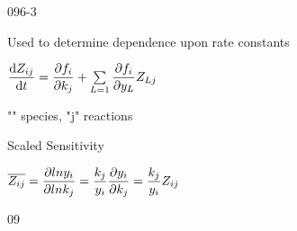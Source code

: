 \begin{mitframe}{096-3}
 \begin{listone}
	\item Used to determine dependence upon rate constants
    \item $\dfrac{\mathrm{d}\compress_{\state{j}}}{\mathrm{d}\timet}=\dfrac{\partial\fug_{\state}}{\partial\thermcond_j}+\sum\limits_{\length=1}\dfrac{\partial\fug_{\state}}{\partial{y}_{\length}}\compress_{\length{j}}$
    \begin{listtwo}
    	\item "\state" species, "j" reactions
    \end{listtwo}
\item Scaled Sensitivity
	\begin{listtwo}
    	\item $\overline{\compress_{\state{j}}}=\dfrac{\partial{ln}y_{\state}}{\partial{ln}\thermcond_j}=\dfrac{\thermcond_j}{y_{\state}}\dfrac{\partial{y_{\state}}}{\partial\thermcond_j}=\dfrac{\thermcond_j}{y_{\state}}\compress_{\state{j}}$
    \end{listtwo}
\end{listone}   
\end{mitframe}09